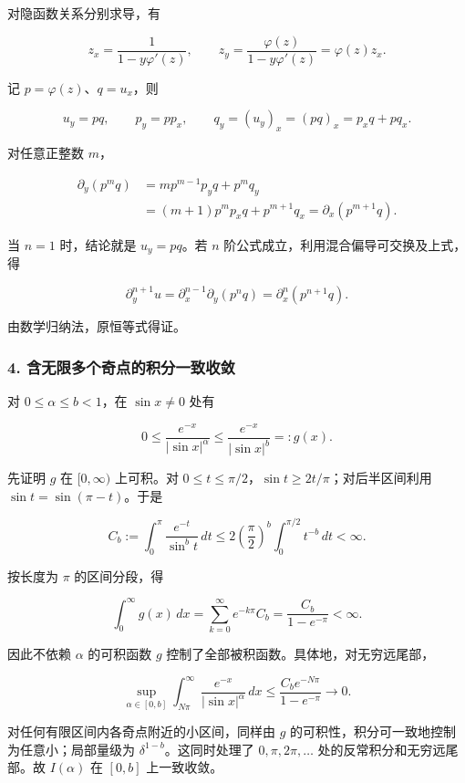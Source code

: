 \documentclass[11pt,fontset=fandol]{ctexart}
\begin{document}
对隐函数关系分别求导，有

\[
z_x=\frac1{1-y\varphi'(z)},\qquad
z_y=\frac{\varphi(z)}{1-y\varphi'(z)}=\varphi(z)z_x.
\]

记 \(p=\varphi(z)\)、\(q=u_x\)，则

\[
u_y=pq,\qquad p_y=pp_x,\qquad
q_y=(u_y)_x=(pq)_x=p_xq+pq_x.
\]

对任意正整数 \(m\)，

\[
\begin{aligned}
\partial_y(p^mq)
&=mp^{m-1}p_yq+p^mq_y\\
&=(m+1)p^mp_xq+p^{m+1}q_x
=\partial_x(p^{m+1}q).
\end{aligned}
\]

当 \(n=1\) 时，结论就是 \(u_y=pq\)。若 \(n\)
阶公式成立，利用混合偏导可交换及上式，得

\[
\partial_y^{n+1}u
=\partial_x^{n-1}\partial_y(p^nq)
=\partial_x^n(p^{n+1}q).
\]

由数学归纳法，原恒等式得证。

\subsubsection{4.
含无限多个奇点的积分一致收敛}\label{ux542bux65e0ux9650ux591aux4e2aux5947ux70b9ux7684ux79efux5206ux4e00ux81f4ux6536ux655b}

对 \(0\le\alpha\le b<1\)，在 \(\sin x\ne0\) 处有

\[
0\le\frac{e^{-x}}{|\sin x|^\alpha}
\le\frac{e^{-x}}{|\sin x|^b}=:g(x).
\]

先证明 \(g\) 在 \([0,\infty)\) 上可积。对
\(0\le t\le\pi/2\)，\(\sin t\ge2t/\pi\)；对后半区间利用
\(\sin t=\sin(\pi-t)\)。于是

\[
C_b:=\int_0^\pi\frac{e^{-t}}{\sin^b t}\,dt
\le2\left(\frac\pi2\right)^b\int_0^{\pi/2}t^{-b}\,dt<\infty.
\]

按长度为 \(\pi\) 的区间分段，得

\[
\int_0^\infty g(x)\,dx
=\sum_{k=0}^\infty e^{-k\pi}C_b
=\frac{C_b}{1-e^{-\pi}}<\infty.
\]

因此不依赖 \(\alpha\) 的可积函数 \(g\)
控制了全部被积函数。具体地，对无穷远尾部，

\[
\sup_{\alpha\in[0,b]}\int_{N\pi}^\infty
\frac{e^{-x}}{|\sin x|^\alpha}\,dx
\le\frac{C_be^{-N\pi}}{1-e^{-\pi}}\longrightarrow0.
\]

对任何有限区间内各奇点附近的小区间，同样由 \(g\)
的可积性，积分可一致地控制为任意小；局部量级为
\(\delta^{1-b}\)。这同时处理了 \(0,\pi,2\pi,\ldots\)
处的反常积分和无穷远尾部。故
\(\boxed{I(\alpha)\text{ 在 }[0,b]\text{ 上一致收敛}}\)。
\end{document}
